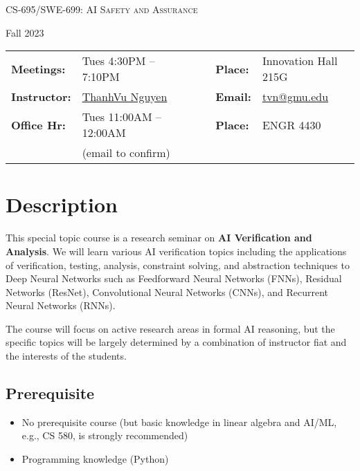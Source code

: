 \documentclass[11pt]{article}
\begin{document}
\begin{center}
{\Large \textsc{CS-695/SWE-699: AI Safety and Assurance}}
\end{center}
\begin{center}
Fall 2023
\end{center}

\begin{center}
\begin{minipage}[t]{.75\textwidth}
\begin{tabular}{llcccll}
  \toprule
  \textbf{Meetings:} & Tues 4:30PM -- 7:10PM  & & & & \textbf{Place:} & Innovation Hall 215G\\
\textbf{Instructor:} & \href{https://go.gmu.edu/tvn}{ThanhVu Nguyen} & & &  & \textbf{Email:} &  \href{mailto:tvn@gmu.edu}{tvn@gmu.edu}\\
\textbf{Office Hr:} & Tues 11:00AM -- 12:00AM & & & & \textbf{Place:} & ENGR 4430\\
&(email to confirm)&&&&&\\
\bottomrule
\end{tabular}
\end{minipage}
\end{center}


\section{Description}
This special topic course is a research seminar on \textbf{\textbf{AI Verification and Analysis}}.
We will learn various AI verification topics including the applications
of verification, testing, analysis, constraint solving, and abstraction
techniques to Deep Neural Networks such as Feedforward Neural Networks
(FNNs), Residual Networks (ResNet), Convolutional Neural Networks
(CNNs), and Recurrent Neural Networks (RNNs).

The course will focus on active research areas in formal AI reasoning,
but the specific topics will be largely determined by a
combination of instructor fiat and the interests of the students.




\subsection*{Prerequisite}
\begin{itemize}
\item No prerequisite course (but basic knowledge in linear algebra and AI/ML, e.g., CS 580, is strongly recommended)
\item Programming knowledge (Python)
\end{itemize}
\end{document}
